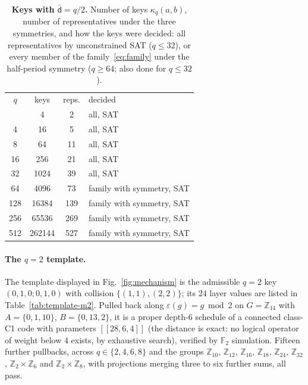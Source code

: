 \documentclass[reprint,twocolumn,superscriptaddress,nofootinbib]{revtex4-2}
\theoremstyle{plain}
\newcommand{\F}{\mathbb{F}_2}
\newcommand{\colbar}{\bar{\mathsf{d}}} %
\begin{document}
\begin{table}[!htbp]
\caption{\textbf{Keys with $\colbar=q/2$.} Number of keys
$\kappa_q(a,b)$, number of representatives under the three symmetries, and
how the keys were decided: all representatives by unconstrained SAT
($q\le32$), or every member of the family~\eqref{eq:family} under the
half-period symmetry ($q\ge64$; also done for $q\le32$).}
\label{tab:family}
\begin{ruledtabular}
\begin{tabular}{cccl}
$q$ & keys & reps. & decided \\
\colrule
2   & 4     & 2   & all, SAT \\
4   & 16    & 5   & all, SAT \\
8   & 64    & 11  & all, SAT \\
16  & 256   & 21  & all, SAT \\
32  & 1024  & 39  & all, SAT \\
64  & 4096  & 73  & family with symmetry, SAT \\
128 & 16384 & 139 & family with symmetry, SAT \\
256 & 65536 & 269 & family with symmetry, SAT \\
512 & 262144 & 527 & family with symmetry, SAT \\
\end{tabular}
\end{ruledtabular}
\end{table}

\paragraph*{The $q=2$ template.}
The template displayed in Fig.~\ref{fig:mechanism} is the admissible
$q=2$ key $(0,1,0;0,1,0)$ with collision $\{(1,1),(2,2)\}$; its $24$ layer
values are listed in Table~\ref{tab:template-m2}. Pulled back along
$\varepsilon(g)=g\bmod2$ on $G=\mathbb{Z}_{14}$ with $A=\{0,1,10\}$,
$B=\{0,13,2\}$, it is a proper depth-$6$ schedule of a connected class-C1
code with parameters $[[28,6,4]]$ (the distance is exact: no logical
operator of weight below $4$ exists, by exhaustive search), verified by
$\F$ simulation.
Fifteen further pullbacks, across $q\in\{2,4,6,8\}$ and the groups
$\mathbb{Z}_{10}$, $\mathbb{Z}_{12}$, $\mathbb{Z}_{16}$, $\mathbb{Z}_{18}$,
$\mathbb{Z}_{24}$, $\mathbb{Z}_{32}$, $\mathbb{Z}_2\times\mathbb{Z}_6$ and
$\mathbb{Z}_2\times\mathbb{Z}_8$, with projections merging three to six
further sums, all pass.
\end{document}
